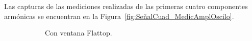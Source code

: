       Las capturas de las mediciones realizadas de las primeras cuatro componentes armónicas
      se encuentran en la Figura~\ref{fig:SeñalCuad_MedicAmplOscilo}.

      \begin{figure}[H]
        \centering
        \begin{subfigure}[H]{0.40\textwidth}
          \caption{Con ventana Flattop.}
        \end{subfigure}
        \hfill 
        \begin{subfigure}[H]{0.40\textwidth}

\end{subfigure}
\end{figure}
